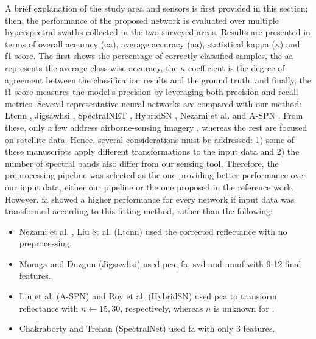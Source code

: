 A brief explanation of the study area and sensors is first provided in this section; then, the performance of the proposed network is evaluated over multiple hyperspectral swaths collected in the two surveyed areas. Results are presented in terms of overall accuracy (\acrshort{oa}), average accuracy (\acrshort{aa}), statistical kappa ($\kappa$) and f1-score. The first shows the percentage of correctly classified samples, the \acrshort{aa} represents the average class-wise accuracy, the $\kappa$ coefficient is the degree of agreement between the classification results and the ground truth, and finally, the f1-score measures the model's precision by leveraging both precision and recall metrics. Several representative neural networks are compared with our method: Lt\acrshort{cnn} \cite{liu_plant_2022}, Jigsaw\acrshort{hsi} \cite{moraga_jigsawhsi_2022}, SpectralNET \cite{chakraborty_spectralnet_2021}, HybridSN \cite{roy_hybridsn_2020}, Nezami et al. \cite{nezami_tree_2020} and A-SPN \cite{xue_attention-based_2021}. From these, only a few address airborne-sensing imagery \cite{liu_plant_2022}, whereas the rest are focused on satellite data. Hence, several considerations must be addressed: 1) some of these manuscripts apply different transformations to the input data and 2) the number of spectral bands also differ from our sensing tool. Therefore, the preprocessing pipeline was selected as the one providing better performance over our input data, either our pipeline or the one proposed in the reference work. However, \acrshort{fa} showed a higher performance for every network if input data was transformed according to this fitting method, rather than the following: 
\begin{itemize}
    \item Nezami et al. \cite{nezami_tree_2020}, Liu et al. \cite{liu_plant_2022} (Lt\acrshort{cnn}) used the corrected reflectance with no preprocessing. 
    \item Moraga and Duzgun \cite{moraga_jigsawhsi_2022} (Jigsaw\acrshort{hsi}) used \acrshort{pca}, \acrshort{fa}, \acrshort{svd} and \acrshort{nnmf} with 9-12 final features.
    \item Liu et al. \cite{liu_plant_2022} (A-SPN) and Roy et al. \cite{roy_hybridsn_2020} (HybridSN) used \acrshort{pca} to transform reflectance with $n \gets 15, 30$, respectively, whereas $n$ is unknown for \cite{xue_attention-based_2021}.
    \item Chakraborty and Trehan \cite{chakraborty_spectralnet_2021} (SpectralNet) used \acrshort{fa} with only 3 features.
\end{itemize}


